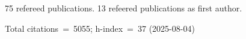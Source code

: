 75 refereed publications. 13 refeered publications as first author.

Total citations~=~5055; h-index~=~37 (2025-08-04)